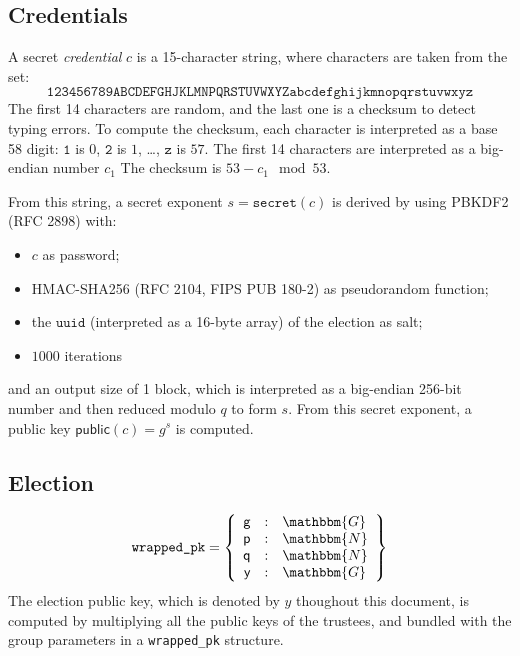 \documentclass[a4paper]{article}
\newcommand{\G}{\mathbbm{G}}
\newcommand{\N}{\mathbbm{N}}
\newcommand{\public}{\textsf{public}}
\newcommand{\uuid}{\texttt{uuid}}
\begin{document}
\subsection{Credentials}
\label{credentials}

\newcommand{\secret}{\texttt{secret}}

A secret \emph{credential} $c$ is a 15-character string, where characters are
taken from the set:
\[\texttt{123456789ABCDEFGHJKLMNPQRSTUVWXYZabcdefghijkmnopqrstuvwxyz}\]
The first 14 characters are random, and the last one is a checksum to
detect typing errors. To compute the checksum, each character is
interpreted as a base 58 digit: $\texttt{1}$ is $0$, $\texttt{2}$ is
$1$, \dots, $\texttt{z}$ is $57$. The first 14 characters are
interpreted as a big-endian number $c_1$ The checksum is $53-c_1\mod
53$.

From this string, a secret exponent $s=\secret(c)$ is derived by using
PBKDF2 (RFC 2898) with:
\begin{itemize}
\item $c$ as password;
\item HMAC-SHA256 (RFC 2104, FIPS PUB 180-2) as pseudorandom function;
\item the $\uuid$ (interpreted as a 16-byte array) of the election as
  salt;
\item $1000$ iterations
\end{itemize}
and an output size of 1 block, which is interpreted as a big-endian
256-bit number and then reduced modulo $q$ to form $s$.  From this
secret exponent, a public key $\public(c)=g^s$ is computed.

\subsection{Election}
\label{elections}

\newcommand{\question}{\texttt{question}}

\begin{gather*}
  \texttt{wrapped\_pk}=\left\{
    \begin{array}{rcl}
      \textsf{g}&:&\G\\
      \textsf{p}&:&\N\\
      \textsf{q}&:&\N\\
      \textsf{y}&:&\G
    \end{array}
  \right\}
\end{gather*}
The election public key, which is denoted by $y$ thoughout this
document, is computed by multiplying all the public keys of the
trustees, and bundled with the group parameters in a
\texttt{wrapped\_pk} structure.
\end{document}
